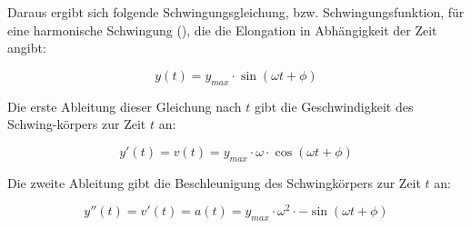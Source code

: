 Daraus ergibt sich folgende Schwingungsgleichung, bzw. Schwingungsfunktion, für eine harmonische Schwingung (), die die Elongation in Abhängigkeit der Zeit angibt:

\begin{equation} \label{eq:schwingungsgleichung_y}
	y(t)=y_{max} \cdot \sin{(\omega t + \phi)}
\end{equation}

Die erste Ableitung dieser Gleichung nach $t$ gibt die Geschwindigkeit des Schwing-körpers zur Zeit $t$ an:

\begin{equation} \label{eq:schwingungsgleichung_v}
	y'(t)=v(t)=y_{max} \cdot \omega \cdot \cos{(\omega t + \phi)}
\end{equation}

Die zweite Ableitung gibt die Beschleunigung des Schwingkörpers zur Zeit $t$ an:

\begin{equation} \label{eq:schwingungsgleichung_a}
	y''(t)=v'(t)=a(t)=y_{max} \cdot \omega^{2} \cdot -\sin{(\omega t + \phi)}
\end{equation}
